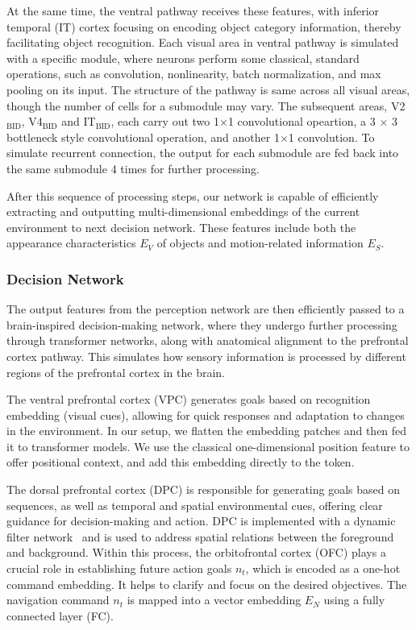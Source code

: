 \documentclass[preprint,12pt]{elsarticle}
\begin{document}
At the same time, the ventral pathway receives these features, with inferior temporal (IT) cortex focusing on encoding object category information, thereby facilitating object recognition.
Each visual area in ventral pathway is simulated with a specific module, where neurons perform some classical, standard operations, such as convolution, nonlinearity, batch normalization, and max pooling on its input. 
The structure of the pathway is same across all visual areas, though the number of cells for a submodule may vary.
The subsequent areas, V2$_\text{BID}$, V4$_\text{BID}$ and IT$_\text{BID}$, each carry out two 1$\times$1 convolutional opeartion, a 3 $ \times $ 3 bottleneck style convolutional operation, and another 1$\times$1 convolution. 
To simulate recurrent connection, the output for each submodule are fed back into the same submodule 4 times for further processing.


%
After this sequence of processing steps, our network is capable of efficiently extracting and outputting multi-dimensional embeddings of the current environment to next decision network. 
These features include both the appearance characteristics $ E_V $ of objects and motion-related information $ E_S $.



\subsubsection{Decision Network}
The output features from the perception network are then efficiently passed to a brain-inspired decision-making network, where they undergo further processing through transformer networks, along with anatomical alignment to the prefrontal cortex pathway. 
This simulates how sensory information is processed by different regions of the prefrontal cortex in the brain.
%


The ventral prefrontal cortex (VPC) generates goals based on recognition embedding (visual cues), allowing for quick responses and adaptation to changes in the environment\cite{passingham2012neurobiology}.
%
In our setup, we flatten the embedding patches and then fed it to transformer models.
We use the classical one-dimensional position feature to offer positional context, and add this embedding directly to the token.


The dorsal prefrontal cortex (DPC) is responsible for generating goals based on sequences, as well as temporal and spatial environmental cues, offering clear guidance for decision-making and action\cite{passingham2012neurobiology}.
DPC is implemented with a dynamic filter network~\cite{jia2016dynamic} and is used to address spatial relations between the foreground and background.
Within this process, the orbitofrontal cortex (OFC) plays a crucial role in establishing future action goals $n_t$, which is encoded as a one-hot command embedding.
It helps to clarify and focus on the desired objectives. 
The navigation command $n_t$ is mapped into a vector embedding $E_N$ using a fully connected layer (FC).
\end{document}
